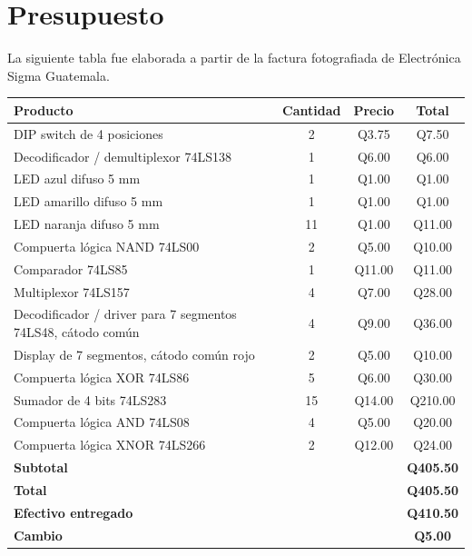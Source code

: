 \documentclass[12pt,a4paper]{article}
\begin{document}
\section{Presupuesto}
La siguiente tabla fue elaborada a partir de la factura fotografiada de Electrónica Sigma Guatemala.

\begin{longtable}{p{6.2cm}c c c}
\toprule
\textbf{Producto} & \textbf{Cantidad} & \textbf{Precio} & \textbf{Total} \\
\midrule
DIP switch de 4 posiciones & 2 & Q3.75 & Q7.50 \\
Decodificador / demultiplexor 74LS138 & 1 & Q6.00 & Q6.00 \\
LED azul difuso 5 mm & 1 & Q1.00 & Q1.00 \\
LED amarillo difuso 5 mm & 1 & Q1.00 & Q1.00 \\
LED naranja difuso 5 mm & 11 & Q1.00 & Q11.00 \\
Compuerta lógica NAND 74LS00 & 2 & Q5.00 & Q10.00 \\
Comparador 74LS85 & 1 & Q11.00 & Q11.00 \\
Multiplexor 74LS157 & 4 & Q7.00 & Q28.00 \\
Decodificador / driver para 7 segmentos 74LS48, cátodo común & 4 & Q9.00 & Q36.00 \\
Display de 7 segmentos, cátodo común rojo & 2 & Q5.00 & Q10.00 \\
Compuerta lógica XOR 74LS86 & 5 & Q6.00 & Q30.00 \\
Sumador de 4 bits 74LS283 & 15 & Q14.00 & Q210.00 \\
Compuerta lógica AND 74LS08 & 4 & Q5.00 & Q20.00 \\
Compuerta lógica XNOR 74LS266 & 2 & Q12.00 & Q24.00 \\
\midrule
\textbf{Subtotal} & & & \textbf{Q405.50} \\
\textbf{Total} & & & \textbf{Q405.50} \\
\textbf{Efectivo entregado} & & & \textbf{Q410.50} \\
\textbf{Cambio} & & & \textbf{Q5.00} \\
\bottomrule
\end{longtable}
\end{document}
